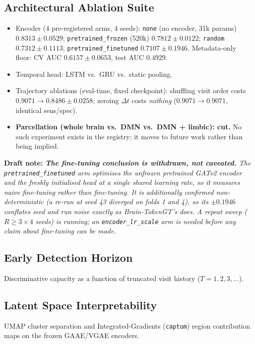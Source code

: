\documentclass[11pt,a4paper]{article}
\newcommand{\draftnote}[1]{%
  \par\noindent\textbf{Draft note:} \textit{#1}\par\vspace{0.5\baselineskip}%
}
\begin{document}
\subsection{Architectural Ablation Suite}
\begin{itemize}
  \item Encoder (4 pre-registered arms, 4 seeds): \texttt{none} (no encoder,
    31k params) $0.8313 \pm 0.0529$; \texttt{pretrained\_frozen} (520k)
    $0.7812 \pm 0.0122$; \texttt{random} $0.7312 \pm 0.1113$;
    \texttt{pretrained\_finetuned} $0.7107 \pm 0.1946$. Metadata-only floor:
    CV AUC $0.6157 \pm 0.0653$, test AUC $0.4929$.
  \item Temporal head: LSTM vs.\ GRU vs.\ static pooling.
  \item Trajectory ablations (eval-time, fixed checkpoint): shuffling visit order costs
    $0.9071 \rightarrow 0.8486 \pm 0.0258$; zeroing $\Delta t$ costs \emph{nothing}
    ($0.9071 \rightarrow 0.9071$, identical sens/spec).
  \item \textbf{Parcellation (whole brain vs.\ DMN vs.\ DMN + limbic): cut.} No such
    experiment exists in the registry; it moves to future work rather than being implied.
\end{itemize}
\draftnote{\textbf{The fine-tuning conclusion is withdrawn, not caveated.} The
  \texttt{pretrained\_finetuned} arm optimises the unfrozen pretrained GATv2 encoder and
  the freshly initialised head at a \emph{single shared} learning rate, so it measures
  naive fine-tuning rather than fine-tuning. It is additionally confirmed
  non-deterministic (a re-run at seed 43 diverged on folds 1 and 4), so its $\pm 0.1946$
  conflates seed and run noise exactly as Brain-TokenGT's does. A repeat sweep
  ($R \ge 3 \times 4$ seeds) is running; an \texttt{encoder\_lr\_scale} arm is needed
  before any claim about fine-tuning can be made.}

\subsection{Early Detection Horizon}
Discriminative capacity as a function of truncated visit history
($T = 1, 2, 3, \ldots$).

\subsection{Latent Space Interpretability}
UMAP cluster separation and Integrated-Gradients (\texttt{captum}) region
contribution maps on the frozen GAAE/VGAE encoders.
\end{document}
